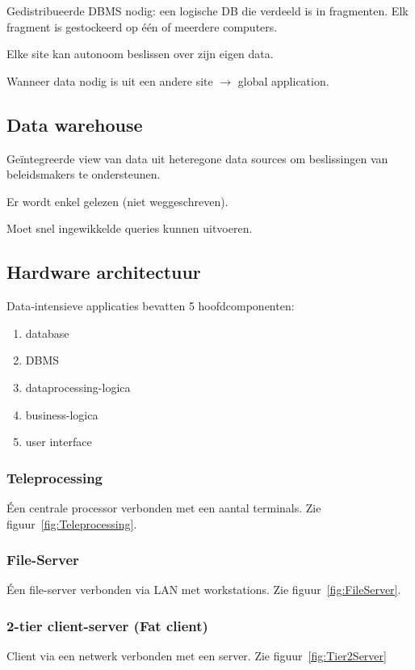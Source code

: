 \documentclass[a4paper,12pt]{article}
\begin{document}
Gedistribueerde DBMS nodig: een logische DB die verdeeld is in fragmenten.
Elk fragment is gestockeerd op één of meerdere computers.

Elke site kan autonoom beslissen over zijn eigen data.

Wanneer data nodig is uit een andere site $\rightarrow$ global application.

\subsection{Data warehouse}
Geïntegreerde view van data uit heteregone data sources om beslissingen van beleidsmakers te ondersteunen.

Er wordt enkel gelezen (niet weggeschreven).

Moet snel ingewikkelde queries kunnen uitvoeren.

\subsection{Hardware architectuur}
Data-intensieve applicaties bevatten 5 hoofdcomponenten:

\begin{enumerate}
\item database
\item DBMS
\item dataprocessing-logica
\item business-logica
\item user interface
\end{enumerate}

\subsubsection{Teleprocessing}
Éen centrale processor verbonden met een aantal terminals.
Zie figuur~\ref{fig:Teleprocessing}.

\subsubsection{File-Server}
Éen file-server verbonden via LAN met workstations.
Zie figuur~\ref{fig:FileServer}.

\subsubsection{2-tier client-server (Fat client)}
Client via een netwerk verbonden met een server.
Zie figuur~\ref{fig:Tier2Server}
\end{document}
